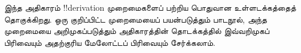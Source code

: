 \documentclass[../../../include/open-logic-chapter]{subfiles}
\begin{document}
      {}
      {}

\begin{editorial}
இந்த அதிகாரம் !!{derivation} முறைமைகளைப் பற்றிய பொதுவான உள்ளடக்கத்தைத்
தொகுக்கிறது. ஒரு குறிப்பிட்ட முறைமையைப் பயன்படுத்தும் பாடநூல், அந்த
முறைமையை அறிமுகப்படுத்தும் அதிகாரத்தின் தொடக்கத்தில் இவ்வறிமுகப் பிரிவையும்
அதற்குரிய மேலோட்டப் பிரிவையும் சேர்க்கலாம்.
\end{editorial}






\OLEndChapterHook
\end{document}
